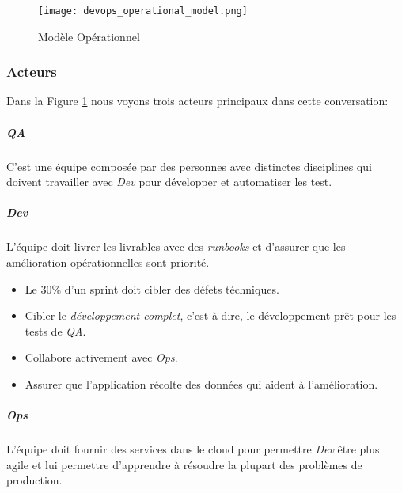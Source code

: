 \begin{figure}[!ht]
\centering
\texttt{[image: devops\_operational\_model.png]}
\caption{Modèle Opérationnel \cite{IsaacSacolick2016DrivingCulture}}
\label{devops_operational_model}
\end{figure}


\subsubsection{Acteurs}
Dans la Figure \ref{devops_operational_model} nous voyons trois acteurs principaux dans cette conversation:

\subparagraph{QA}
C'est une équipe composée par des personnes avec distinctes disciplines qui doivent travailler avec \textit{Dev} pour développer et automatiser les test.
\subparagraph{Dev} L'équipe doit livrer les livrables avec des \emph{runbooks} et d'assurer que les amélioration opérationnelles sont priorité.
\begin{itemize}
  \item Le 30\% d'un sprint doit cibler des défets téchniques.
  \item Cibler le \emph{développement complet}, c'est-à-dire, le développement prêt pour les tests de \textit{QA}.
  \item Collabore activement avec \textit{Ops}.
  \item Assurer que l'application récolte des données qui aident à l'amélioration.
\end{itemize}
\subparagraph{Ops}
L'équipe doit fournir des services dans le cloud pour permettre \textit{Dev} être plus agile et lui permettre d'apprendre à résoudre la plupart des problèmes de production.
